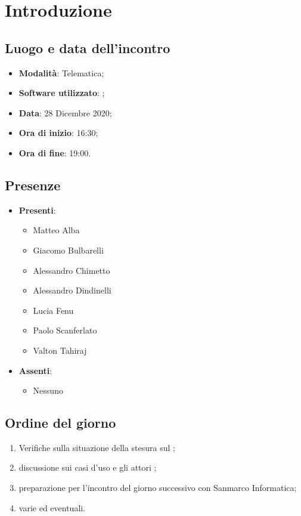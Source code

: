 \documentclass[]{article}
\begin{document}
	
	
	
	\newpage
	
	\section{Introduzione}
		\subsection{Luogo e data dell'incontro}
		\begin{itemize}
			\item \textbf{Modalità}: Telematica;
			\item \textbf{Software utilizzato}: ;
			\item \textbf{Data}: 28 Dicembre 2020;
			\item \textbf{Ora di inizio}: 16:30;
			\item \textbf{Ora di fine}: 19:00.
		\end{itemize}

		\subsection{Presenze}
		\begin{itemize}
			\item \textbf{Presenti}:
		\begin{itemize}
			\item Matteo Alba
			\item Giacomo Bulbarelli
			\item Alessandro Chimetto
			\item Alessandro Dindinelli
			\item Lucia Fenu
			\item Paolo Scanferlato
			\item Valton Tahiraj
		\end{itemize}
			\item \textbf{Assenti}:
			\begin{itemize}
				\item Nessuno
			\end{itemize}
		\end{itemize}
	
		\subsection{Ordine del giorno}
		\begin{enumerate}
			\item Verifiche sulla situazione della stesura sul ;
			\item discussione sui casi d'uso e gli attori ;
			\item preparazione per l'incontro del giorno successivo con Sanmarco Informatica;
			\item varie ed eventuali.
		\end{enumerate}
	
\end{document}

